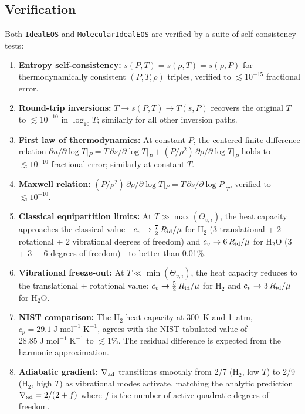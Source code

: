 \documentclass[twocolumn]{aastex701}
\begin{document}
\subsection{Verification}\label{sec:ideal_verification}

Both \texttt{IdealEOS} and \texttt{MolecularIdealEOS} are verified by a suite of self-consistency tests:

\begin{enumerate}
    \item \textbf{Entropy self-consistency:} $s(P,T) = s(\rho,T) = s(\rho,P)$ for thermodynamically consistent $(P,T,\rho)$ triples, verified to $\lesssim 10^{-15}$ fractional error.
    \item \textbf{Round-trip inversions:} $T \to s(P,T) \to T(s,P)$ recovers the original $T$ to $\lesssim 10^{-10}$ in $\log_{10} T$; similarly for all other inversion paths.
    \item \textbf{First law of thermodynamics:} At constant $P$, the centered finite-difference relation
    $\partial u / \partial \log T |_P = T\,\partial s / \partial \log T |_P + (P/\rho^2)\,\partial\rho/\partial\log T |_P$
    holds to $\lesssim 10^{-10}$ fractional error; similarly at constant $T$.
    \item \textbf{Maxwell relation:} $(P/\rho^2)\,\partial\rho/\partial\log T|_P = T\,\partial s/\partial\log P|_T$, verified to $\lesssim 10^{-10}$.
    \item \textbf{Classical equipartition limits:} At $T \gg \max(\Theta_{v,i})$, the heat capacity approaches the classical value---$c_v \to \frac{7}{2}\,R_{\rm id}/\mu$ for H$_2$ (3 translational + 2 rotational + 2 vibrational degrees of freedom) and $c_v \to 6\,R_{\rm id}/\mu$ for H$_2$O (3 + 3 + 6 degrees of freedom)---to better than 0.01\%.
    \item \textbf{Vibrational freeze-out:} At $T \ll \min(\Theta_{v,i})$, the heat capacity reduces to the translational + rotational value: $c_v \to \frac{5}{2}\,R_{\rm id}/\mu$ for H$_2$ and $c_v \to 3\,R_{\rm id}/\mu$ for H$_2$O.
    \item \textbf{NIST comparison:} The H$_2$ heat capacity at 300~K and 1~atm, $c_p = 29.1\;\mathrm{J\;mol^{-1}\;K^{-1}}$, agrees with the NIST tabulated value of $28.85\;\mathrm{J\;mol^{-1}\;K^{-1}}$ to $\lesssim 1\%$.  The residual difference is expected from the harmonic approximation.
    \item \textbf{Adiabatic gradient:} $\nabla_{\rm ad}$ transitions smoothly from 2/7 (H$_2$, low $T$) to 2/9 (H$_2$, high $T$) as vibrational modes activate, matching the analytic prediction $\nabla_{\rm ad} = 2/(2 + f)$ where $f$ is the number of active quadratic degrees of freedom.
\end{enumerate}
\end{document}

